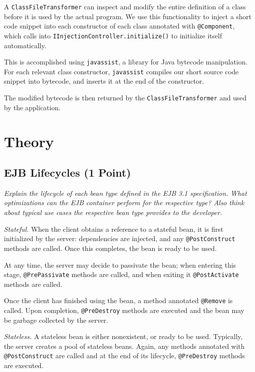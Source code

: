 \documentclass[a4paper,10pt]{article}
\begin{document}
A \lstinline|ClassFileTransformer| can inspect and modify the entire definition of
a class before it is used by the actual program. We use this functionality to
inject a short code snippet into each constructor of each class annotated with \lstinline|@Component|,
which calls into \lstinline|IInjectionController.initialize()| to initialize itself
automatically.

This is accomplished using \verb|javassist|, a library for Java bytecode manipulation.
For each relevant class constructor, \verb|javassist| compiles our short source
code snippet into bytecode, and inserts it at the end of the constructor.

The modified bytecode is then returned by the \lstinline|ClassFileTransformer| and
used by the application.


\section{Theory}

\subsection{EJB Lifecycles (1 Point)}

\emph{
Explain the lifecycle of each bean type defined in the EJB 3.1 specification. What optimizations can the
EJB container perform for the respective type? Also think about typical use cases the respective bean
type provides to the developer.}

\vspace{3mm}

\emph{Stateful.} When the client obtains a reference to a stateful bean, it is first
initialized by the server: dependencies are injected, and any \lstinline|@PostConstruct| methods
are called. Once this completes, the bean is ready to be used.

At any time, the server may decide to passivate the bean; when entering this stage,
\lstinline|@PrePassivate| methods are called, and when exiting it \lstinline|@PostActivate| methods
are called.

Once the client has finished using the bean, a method annotated \lstinline|@Remove| is called.
Upon completion, \lstinline|@PreDestroy| methods are executed and the bean may be garbage collected by the server.

\vspace{3mm}

\emph{Stateless.} A stateless bean is either nonexistent, or ready to be used. Typically, the server
creates a pool of stateless beans. Again, any methods annotated with \lstinline|@PostConstruct| are
called and at the end of its lifecycle, \lstinline|@PreDestroy| methods are executed.
\end{document}
